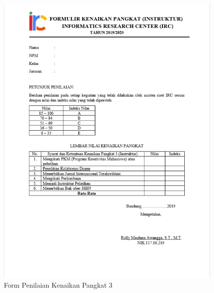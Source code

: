 \begin{figure}[H]
        \centerline{\includegraphics[scale=0.8]{figures/pangkat3}}
        \caption{Form Penilaian Kenaikan Pangkat 3}
		\label{pangkat3}
\end{figure}


